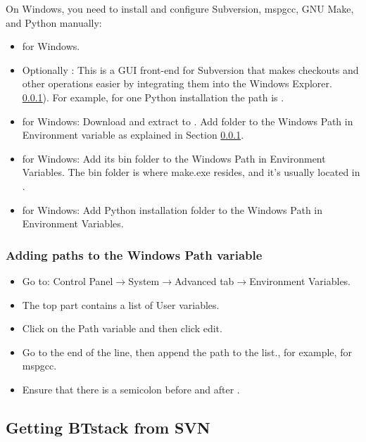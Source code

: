 On Windows, you need to install and configure Subversion, mspgcc, GNU Make, and Python manually:
 \begin{itemize}
 \item \Subversion{} for Windows.
 \item Optionally \Tortoise{}: This is a GUI front-end for Subversion that makes checkouts and other operations easier by integrating them into the Windows Explorer.
 \ref{sec:windowsPath}). For example, for one Python installation the path is  . 
 \item \mspgcc{} for Windows:  Download and extract to . Add  folder to the Windows Path in Environment variable as explained in Section \ref{sec:windowsPath}.
 \item \GNUMake{} for Windows: Add its bin folder to the Windows Path in Environment Variables. The bin folder is where make.exe resides, and it's usually located in . 
 \item \Python{} for Windows: Add Python installation folder to the Windows Path in Environment Variables.
 \end{itemize}

\subsubsection{Adding paths to the Windows Path variable}\label{sec:windowsPath}
\begin{itemize} 
   \item Go to: Control Panel$\rightarrow$System$\rightarrow$Advanced tab$\rightarrow$Environment Variables.
   \item The top part contains a list of User variables. 
   \item Click on the Path variable and then click edit.
   \item Go to the end of the line, then append the path to the list., for example,  for mspgcc.
   \item Ensure that there is a semicolon before and after . 
\end{itemize}


\subsection{Getting BTstack from SVN}

